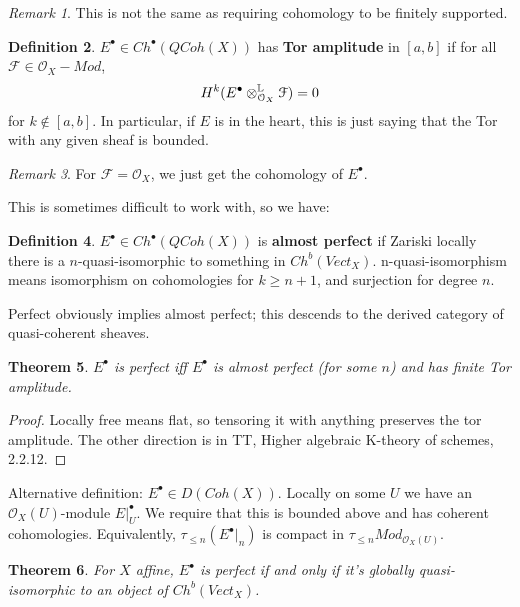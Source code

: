 \documentclass[10pt,a4paper,reqno,oneside]{book} %
\theoremstyle{plain}
\newtheorem{thm}{Theorem}[section]
\theoremstyle{definition}
\newtheorem{defin}[thm]{Definition}
\theoremstyle{remark}
\newtheorem{rem}[thm]{Remark}
\numberwithin{equation}{section}
\begin{document}
\begin{rem}
This is not the same as requiring cohomology to be finitely supported.
\end{rem}

\begin{defin}
$E^{\bullet} \in Ch^{\bullet}(QCoh(X))$ has \textbf{Tor amplitude} in $[a,b]$ if for all $\mathcal{F} \in \mathcal{O}_X -Mod$,
\[	H^k(E^{\bullet} \otimes^{\mathbb L}_{\mathcal{O}_X} \mathcal{F}) = 0	\]
for $k \not \in [a,b]$. In particular, if $E$ is in the heart, this is just saying that the Tor with any given sheaf is bounded.
\end{defin}

\begin{rem}
For $\mathcal{F} = \mathcal{O}_X$, we just get the cohomology of $E^{\bullet}$.
\end{rem}

This is sometimes difficult to work with, so we have:

\begin{defin}
$E^{\bullet} \in Ch^{\bullet}(QCoh(X))$ is \textbf{almost perfect} if Zariski locally there is a $n$-quasi-isomorphic to
something in $Ch^b(Vect_X)$. n-quasi-isomorphism means isomorphism on cohomologies for $k\geq n+1$, and surjection
for degree $n$.
\end{defin}

Perfect obviously implies almost perfect; this descends to the derived category of quasi-coherent sheaves.

\begin{thm}
$E^{\bullet}$ is perfect iff $E^{\bullet}$ is almost perfect (for some $n$) and has finite Tor amplitude.
\end{thm}
\begin{proof}
Locally free means flat, so tensoring it with anything preserves the tor amplitude. The other direction is in
TT, Higher algebraic K-theory of schemes, 2.2.12.
\end{proof}

Alternative definition: $E^{\bullet} \in D(Coh(X))$. Locally on some $U$ we have an $\mathcal{O}_X(U)$-module
$E|_{U}^{\bullet}$. We require that this is bounded above and has coherent cohomologies. Equivalently, $\tau_{\leq n}(E^{\bullet}|_n)$
is compact in $\tau_{\leq n} Mod_{\mathcal{O}_X(U)}$.

\begin{thm}
For $X$ affine, $E^{\bullet}$ is perfect if and only if it's globally quasi-isomorphic to an object of $Ch^b(Vect_X)$.
\end{thm}
\end{document}
